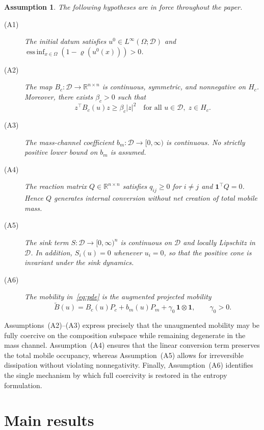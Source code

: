 \documentclass{article}
\newtheorem{assumption}[theorem]{Assumption}
\newcommand{\R}{\mathbb{R}}
\newcommand{\bone}{\mathbf{1}}
\newcommand{\D}{\mathcal{D}}
\newcommand{\Be}{\widetilde{B}}       %
\newcommand{\Pc}{P_c}                 %
\newcommand{\Pm}{P_m}                 %
\newcommand{\Hc}{H_c}                 %
\begin{document}
\begin{assumption}\label{ass}
The following hypotheses are in force throughout the paper.
\begin{description}
  \item[(A1)] The initial datum satisfies
    $u^0\in L^\infty(\Omega;\D)$ and
    $\operatorname{ess\,inf}_{x\in\Omega}(1-\varrho(u^0(x)))>0$.
  \item[(A2)] The map $B_c:\D\to\R^{n\times n}$ is continuous,
    symmetric, and nonnegative on $\Hc$. Moreover, there exists
    $\beta_c>0$ such that
    \[
      z^\top B_c(u)z \ge \beta_c|z|^2
      \quad\text{for all }u\in\D,\; z\in\Hc.
    \]
  \item[(A3)] The mass-channel coefficient $b_m:\D\to[0,\infty)$ is
    continuous. No strictly positive lower bound on $b_m$ is assumed.
  \item[(A4)] The reaction matrix $Q\in\R^{n\times n}$ satisfies
    $q_{ij}\ge 0$ for $i\ne j$ and $\bone^\top Q=0$. Hence $Q$
    generates internal conversion without net creation of total mobile
    mass.
  \item[(A5)] The sink term $S:\D\to[0,\infty)^n$ is continuous on
    $\D$ and locally Lipschitz in $\D$. In addition,
    $S_i(u)=0$ whenever $u_i=0$, so that the positive cone is
    invariant under the sink dynamics.
  \item[(A6)] The mobility in~\eqref{eq:pde} is the augmented
    projected mobility
    \[
      \Be(u) = B_c(u)\Pc + b_m(u)\Pm + \gamma_0\,\bone\otimes\bone,
      \qquad \gamma_0>0.
    \]
\end{description}
\end{assumption}

Assumptions~(A2)--(A3) express precisely that the unaugmented mobility
may be fully coercive on the composition subspace while remaining
degenerate in the mass channel. Assumption~(A4) ensures that the linear
conversion term preserves the total mobile occupancy, whereas
Assumption~(A5) allows for irreversible dissipation without violating
nonnegativity. Finally, Assumption~(A6) identifies the single mechanism
by which full coercivity is restored in the entropy formulation.

\section{Main results}
\label{sec:main}
\end{document}
